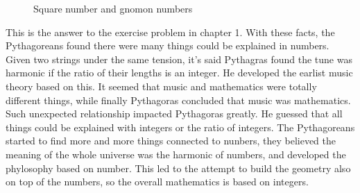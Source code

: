 \documentclass[b5paper]{article}
\begin{document}
\begin{figure}[htbp]
\centering
{}
\caption{Square number and gnomon numbers}
\label{fig:square-num}
\end{figure}

This is the answer to the exercise problem in chapter 1. With these facts, the Pythagoreans found there were many things could be explained in numbers. Given two strings under the same tension, it's said Pythagras found the tune was harmonic if the ratio of their lengths is an integer. He developed the earlist music theory based on this. It seemed that music and mathematics were totally different things, while finally Pythagoras concluded that music was mathematics. Such unexpected relationship impacted Pythagoras greatly. He guessed that all things could be explained with integers or the ratio of integers. The Pythagoreans started to find more and more things connected to nunbers, they believed the meaning of the whole universe was the harmonic of numbers, and developed the phylosophy based on number. This led to the attempt to build the geometry also on top of the numbers, so the overall mathematics is based on integers.
\end{document}
